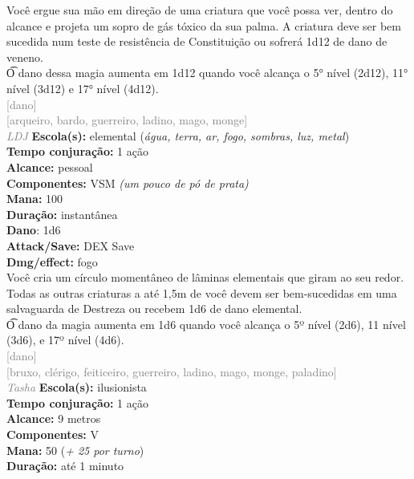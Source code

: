 \documentclass{RPG_Adventure}[2021/10/20]
\begin{document}
{\normalsize Você ergue sua mão em direção de uma criatura que você possa ver, dentro do alcance e projeta um sopro de gás tóxico da sua palma. A criatura deve ser bem sucedida num teste de resistência de Constituição ou sofrerá 1d12 de dano de veneno.\\\t O dano dessa magia aumenta em 1d12 quando você alcança o 5° nível (2d12), 11° nível (3d12) e 17° nível (4d12).\\}
{\scriptsize \textcolor{gray}{[dano]\\}}
{\scriptsize \textcolor{gray}{[arqueiro, bardo, guerreiro, ladino, mago, monge]\\}}
{\tiny \textcolor{gray}{\textit{LDJ}}}\jump{}
{\small \t \textbf{Escola(s):} elemental (\textit{água, terra, ar, fogo, sombras, luz, metal})\\\t \textbf{Tempo conjuração:} 1 ação\\\t \textbf{Alcance:} pessoal\\\t \textbf{Componentes:} VSM \textit{(um pouco de pó de prata)}\\\t \textbf{Mana:} 100\\\t \textbf{Duração:} instantânea\\\t \textbf{Dano}: 1d6\\\t \textbf{Attack/Save:} DEX Save\\\t \textbf{Dmg/effect:} fogo\\}
{\normalsize Você cria um círculo momentâneo de lâminas elementais que giram ao seu redor. Todas as outras criaturas a até 1,5m de você devem ser bem-sucedidas em uma salvaguarda de Destreza ou recebem 1d6 de dano elemental.\\\t O dano da magia aumenta em 1d6 quando você alcança o 5º nível (2d6), 11 nível (3d6), e 17º nível (4d6).\\}
{\scriptsize \textcolor{gray}{[dano]\\}}
{\scriptsize \textcolor{gray}{[bruxo, clérigo, feiticeiro, guerreiro, ladino, mago, monge, paladino]\\}}
{\tiny \textcolor{gray}{\textit{Tasha}}}\jump{}
{\small \t \textbf{Escola(s):} ilusionista\\\t \textbf{Tempo conjuração:} 1 ação\\\t \textbf{Alcance:} 9 metros\\\t \textbf{Componentes:} V\\\t \textbf{Mana:} 50 (\textit{+ 25 por turno})\\\t \textbf{Duração:} até 1 minuto\\}
\end{document}
